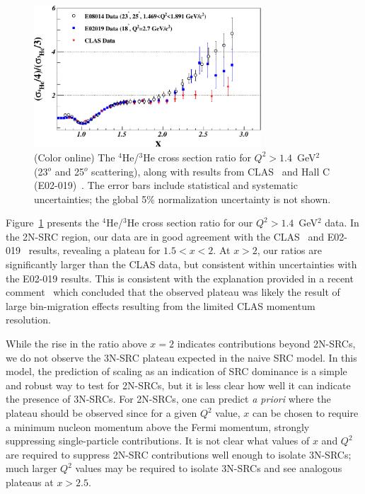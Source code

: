 
                \begin{figure}[!ht]
		\begin{center}
		  \includegraphics[width=8.5cm,angle=0]{He4_He3_XS_Ratio_XbjJan08_XbjJan08.pdf}
		\end{center}
		\vspace*{-5mm}
		\caption{(Color online) The $^4$He/$^3$He cross section ratio for $Q^2>1.4$~GeV$^2$ (23$^o$ and 25$^o$ scattering),
                  along with results from CLAS~\cite{PhysRevLett.96.082501} and Hall C (E02-019)~\cite{fomin2012}. The error bars include
                  statistical and systematic uncertainties; the global 5\% normalization uncertainty is not shown.}
		\label{fig:ratios_highqsq}
		\end{figure}

Figure~\ref{fig:ratios_highqsq} presents the $^4$He/$^3$He cross section ratio for our $Q^2 > 1.4$~GeV$^2$
data. In the 2N-SRC region, our data are in good agreement with the CLAS~\cite{PhysRevLett.96.082501} and
E02-019~\cite{fomin2012} results, revealing a plateau for $1.5 < x < 2$. At $x>2$, our
ratios are significantly larger than the CLAS data, but consistent within uncertainties with the E02-019
results. This is consistent with the explanation provided in a recent comment~\cite{Higinbotham:2014xna}
which concluded that the observed plateau was likely the result of large bin-migration effects resulting from
the limited CLAS momentum resolution.

While the rise in the ratio above $x=2$ indicates contributions beyond 2N-SRCs, we do not observe the 3N-SRC
plateau expected in the naive SRC model. In this model, the prediction of scaling as an indication of SRC
dominance is a simple and robust way to test for 2N-SRCs, but it is less clear how well it can indicate the
presence of 3N-SRCs. For 2N-SRCs, one can predict \textit{a priori} where the plateau should be observed
since for a given $Q^2$ value, $x$ can be chosen to require a minimum nucleon momentum above the Fermi
momentum, strongly suppressing single-particle contributions. It is not clear what values of $x$ and $Q^2$
are required to suppress 2N-SRC contributions well enough to isolate 3N-SRCs; much larger $Q^2$ values may
be required to isolate 3N-SRCs and see analogous plateaus at $x>2.5$.

